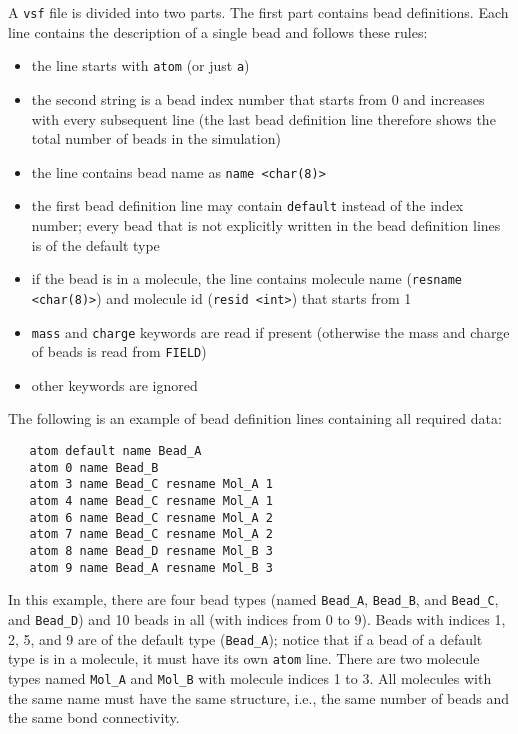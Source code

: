 A \texttt{vsf} file is divided into two parts. The first part contains bead
definitions. Each line contains the description of a single bead and
follows these rules:

\begin{itemize}[topsep=0pt,itemsep=0pt]
  \item the line starts with \texttt{atom} (or just \texttt{a})
  \item the second string is a bead index number that starts from 0 and
    increases with every subsequent line (the last bead definition line
    therefore shows the total number of beads in the simulation)
  \item the line contains bead name as \texttt{name <char(8)>}
  \item the first bead definition line may contain \texttt{default} instead
    of the index number; every bead that is not explicitly written in the
    bead definition lines is of the default type
  \item if the bead is in a molecule, the line contains molecule name
    (\texttt{resname <char(8)>}) and molecule id (\texttt{resid <int>})
    that starts from 1
  \item \texttt{mass} and \texttt{charge} keywords are read if present
    (otherwise the mass and charge of beads is read from \texttt{FIELD})
  \item other keywords are ignored
\end{itemize}

The following is an example of bead definition lines containing all
required data:

\begin{verbatim}
   atom default name Bead_A
   atom 0 name Bead_B
   atom 3 name Bead_C resname Mol_A 1
   atom 4 name Bead_C resname Mol_A 1
   atom 6 name Bead_C resname Mol_A 2
   atom 7 name Bead_C resname Mol_A 2
   atom 8 name Bead_D resname Mol_B 3
   atom 9 name Bead_A resname Mol_B 3
\end{verbatim}

In this example, there are four bead types (named \texttt{Bead\_A},
\texttt{Bead\_B}, and \texttt{Bead\_C}, and \texttt{Bead\_D}) and 10 beads
in all (with indices from 0 to 9). Beads with indices 1, 2, 5, and 9 are of
the default type (\texttt{Bead\_A}); notice that if a bead of a default
type is in a molecule, it must have its own \texttt{atom} line. There are
two molecule types named \texttt{Mol\_A} and \texttt{Mol\_B} with molecule
indices 1 to 3. All molecules with the same name must have the same
structure, i.e., the same number of beads and the same bond connectivity.

